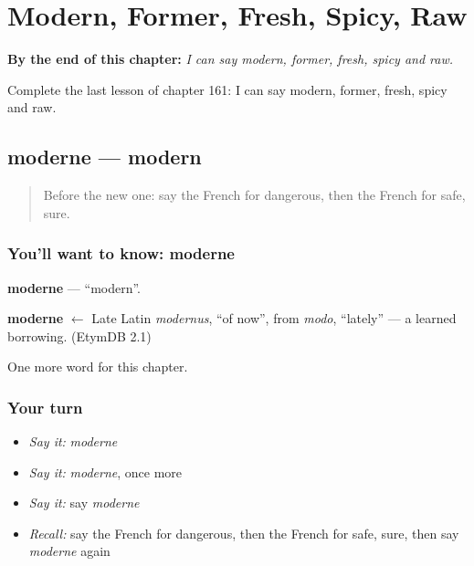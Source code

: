 
\chapter{Modern, Former, Fresh, Spicy, Raw}
\label{ch:fr-modern-former-fresh-spicy-raw}

\begin{chapteropening}
\textbf{By the end of this chapter:} \emph{I can say modern, former, fresh, spicy and raw.}

Complete the last lesson of chapter 161: I can say modern, former, fresh, spicy and raw.
\end{chapteropening}

\section[moderne]{moderne — modern}

\label{lesson:FR-C161-moderne}



\begin{quote}
Before the new one: say the French for dangerous, then the French for safe, sure.
\end{quote}

\subsection*{You'll want to know: moderne}
\textbf{moderne} — \textquotedblleft{}modern\textquotedblright{}.

\begin{cousinweb}
\textbf{moderne} $\leftarrow$ Late Latin \emph{modernus}, \textquotedblleft{}of now\textquotedblright{}, from \emph{modo}, \textquotedblleft{}lately\textquotedblright{} — a learned borrowing. (EtymDB 2.1)
\end{cousinweb}

\begin{grammarlens}[title={What you've built}]
One more word for this chapter.
\end{grammarlens}

\subsection*{Your turn}
\begin{itemize}
\raggedright
  \item \emph{Say it:} \emph{moderne}
  \item \emph{Say it:} \emph{moderne}, once more
  \item \emph{Say it:} say \emph{moderne}
  \item \emph{Recall:} say the French for dangerous, then the French for safe, sure, then say \emph{moderne} again
\end{itemize}

